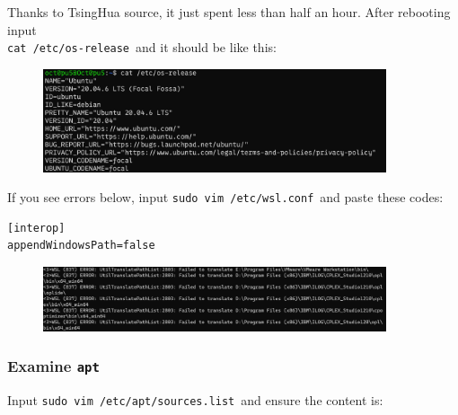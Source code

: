 \documentclass[12pt]{ctexart}
\begin{document}
Thanks to TsingHua source, it just spent less than half an hour. After
rebooting input\\ \texttt{cat\ /etc/os-release}\ and it should be like
this:

\begin{figure}[H]
    \centering
    \includegraphics[width=0.9\textwidth,keepaspectratio]{assets/Linux/2.3 I upgraded alone/4.png}
\end{figure}


If you see errors below, input \texttt{sudo\ vim\ /etc/wsl.conf}\ and
paste these codes:

\begin{adjustwidth}{2em}{0pt}
\begin{verbatim}
[interop]
appendWindowsPath=false
\end{verbatim}
\end{adjustwidth}

\begin{figure}[H]
    \centering
    \includegraphics[width=0.9\textwidth,keepaspectratio]{assets/Linux/2.3 I upgraded alone/5.png}
\end{figure}


\subsubsection{\textbf{Examine} \texttt{apt}}

Input \texttt{sudo\ vim\ /etc/apt/sources.list}\ and ensure the content
is:
\end{document}
